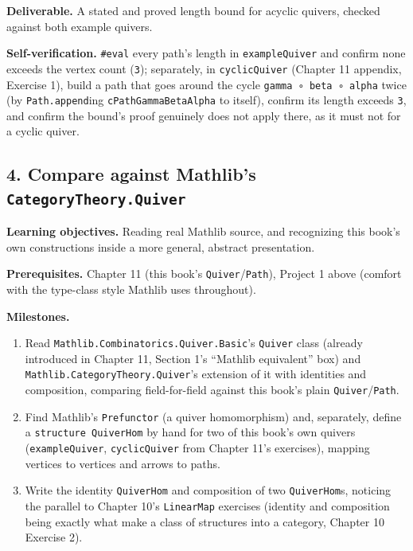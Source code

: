 \textbf{Deliverable.} A stated and proved length bound for acyclic quivers, checked against both example quivers.

\textbf{Self-verification.} \texttt{\#eval} every path's length in \texttt{exampleQuiver} and confirm none exceeds the vertex count (\texttt{3}); separately, in \texttt{cyclicQuiver} (Chapter 11 appendix, Exercise 1), build a path that goes around the cycle \texttt{gamma ∘ beta ∘ alpha} twice (by \texttt{Path.append}ing \texttt{cPathGammaBetaAlpha} to itself), confirm its length exceeds \texttt{3}, and confirm the bound's proof genuinely does not apply there, as it must not for a cyclic quiver.

\subsection{\texorpdfstring{4. Compare against Mathlib's \texttt{CategoryTheory.Quiver}}{4. Compare against Mathlib's CategoryTheory.Quiver}}\label{sec:13-next-steps:03-next-projects:5}

\textbf{Learning objectives.} Reading real Mathlib source, and recognizing this book's own constructions inside a more general, abstract presentation.

\textbf{Prerequisites.} Chapter 11 (this book's \texttt{Quiver}/\texttt{Path}), Project 1 above (comfort with the type-class style Mathlib uses throughout).

\textbf{Milestones.}

\begin{enumerate}
\def\labelenumi{\arabic{enumi}.}
\tightlist
\item
  Read \texttt{Mathlib.Combinatorics.Quiver.Basic}'s \texttt{Quiver} class (already introduced in Chapter 11, Section 1's ``Mathlib equivalent'' box) and \texttt{Mathlib.CategoryTheory.Quiver}'s extension of it with identities and composition, comparing field-for-field against this book's plain \texttt{Quiver}/\texttt{Path}.
\item
  Find Mathlib's \texttt{Prefunctor} (a quiver homomorphism) and, separately, define a \texttt{structure QuiverHom} by hand for two of this book's own quivers (\texttt{exampleQuiver}, \texttt{cyclicQuiver} from Chapter 11's exercises), mapping vertices to vertices and arrows to paths.
\item
  Write the identity \texttt{QuiverHom} and composition of two \texttt{QuiverHom}s, noticing the parallel to Chapter 10's \texttt{LinearMap} exercises (identity and composition being exactly what make a class of structures into a category, Chapter 10 Exercise 2).
\end{enumerate}

